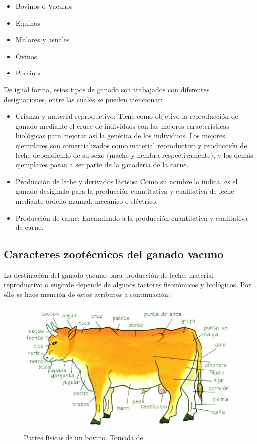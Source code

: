 \begin{itemize}
\item Bovinos ó Vacunos
\item Equinos
\item Mulares y asnales
\item Ovinos
\item Porcinos
\end{itemize}

De igual forma, estos tipos de ganado son trabajados con diferentes designaciones, entre las cuales se pueden mencionar:

\begin{itemize}
\item Crianza y material reproductivo: Tiene como objetivo la reproducción de ganado mediante el cruce de individuos con las mejores características biológicas para mejorar así la genética de los individuos. Los mejores ejemplares son comercializados como material reproductivo y producción de leche dependiendo de su sexo (macho y hembra respectivamente), y los demás ejemplares pasan a ser parte de la ganadería de la carne.
\item Producción de leche y derivados lácteos: Como su nombre lo indica, es el ganado designado para la producción cuantitativa y cualitativa de leche mediante ordeño manual, mecánico o eléctrico.
\item Producción de carne: Encaminado a la producción cuantitativa y cualitativa de carne.
\end{itemize}

\subsection{Caracteres zootécnicos del ganado vacuno}

La destinación del ganado vacuno para producción de leche, material reproductivo o engorde depende de algunos factores fisonómicos y biológicos. Por ello se hace mención de estos atributos a continuación:

\begin{figure}[H]
 \begin{center}
 \includegraphics[scale=0.9]{img/dibujito1.png}
 \end{center}
 \caption{Partes físicas de un bovino. Tomada de \cite{librito1}}
\end{figure}

